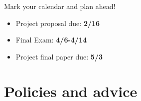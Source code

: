 \documentclass[11pt,article,oneside]{memoir} %
\begin{document}
Mark your calendar and plan ahead!

\vspace{-10pt}
\begin{itemize}\itemsep=0pt%
\item Project proposal due: \textbf{2/16}
\item Final Exam: \textbf{4/6-4/14}
\item Project final paper due: \textbf{5/3}
\end{itemize} %





\section{Policies and advice} %
\end{document}
